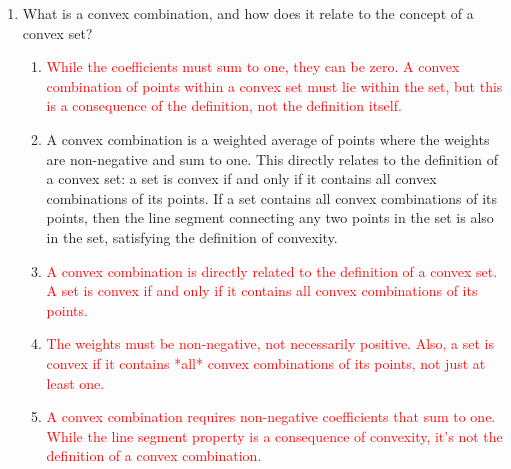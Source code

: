 \documentclass{article}%
\newcommand{\incorrect}[1]{\textcolor{red}{#1}}
\begin{document}
\begin{enumerate}
\begin{enumerate}
\item \incorrect{$(4, 6)$ is not a convex combination of $(1, 2)$ and $(3, 4)$ because it lies outside the line segment connecting them.  Extrapolating the line segment would require $\lambda$ to be greater than 1, which is not allowed in a convex combination.}%
\item \incorrect{$(1, 1)$ is not a convex combination of $(1, 2)$ and $(3, 4)$ because it does not lie on the line segment connecting them.  A convex combination must be a weighted average of the points, with weights between 0 and 1.}%
\item \incorrect{$(5, 6)$ is not a convex combination of $(1, 2)$ and $(3, 4)$ because it lies outside the line segment connecting them.  Extrapolating the line segment would require $\lambda$ to be greater than 1, which is not allowed in a convex combination.}%
\end{enumerate}%
\vspace{1em}%
\item What is a convex combination, and how does it relate to the concept of a convex set?%
\begin{enumerate}%
\item \incorrect{While the coefficients must sum to one, they can be zero.  A convex combination of points within a convex set must lie within the set, but this is a consequence of the definition, not the definition itself.}%
\item A convex combination is a weighted average of points where the weights are non-negative and sum to one.  This directly relates to the definition of a convex set: a set is convex if and only if it contains all convex combinations of its points.  If a set contains all convex combinations of its points, then the line segment connecting any two points in the set is also in the set, satisfying the definition of convexity.%
\item \incorrect{A convex combination is directly related to the definition of a convex set.  A set is convex if and only if it contains all convex combinations of its points.}%
\item \incorrect{The weights must be non-negative, not necessarily positive.  Also, a set is convex if it contains *all* convex combinations of its points, not just at least one.}%
\item \incorrect{A convex combination requires non-negative coefficients that sum to one.  While the line segment property is a consequence of convexity, it's not the definition of a convex combination.}%

\end{enumerate}
\end{enumerate}
\end{document}
